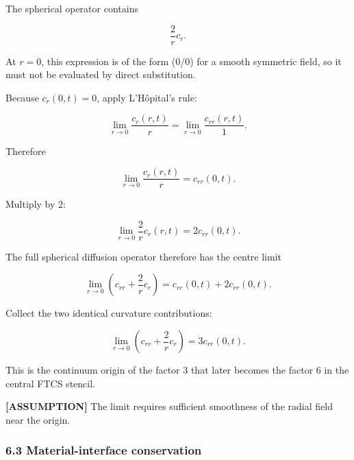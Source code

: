 \documentclass[11pt,a4paper]{article}
\begin{document}
The spherical operator contains

\begin{equation}
\frac{2}{r}c_r.
\tag{TRISO-BC-104}
\label{eq:triso-bc-104}
\end{equation}

At $r=0$, this expression is of the form (0/0) for a smooth symmetric field, so it must not be evaluated by direct substitution.

Because $c_r(0,t)=0$, apply L'Hôpital's rule:

\begin{equation}
\lim_{r\to0}\frac{c_r(r,t)}{r}
=
\lim_{r\to0}\frac{c_{rr}(r,t)}{1}.
\tag{TRISO-BC-105}
\label{eq:triso-bc-105}
\end{equation}

Therefore

\begin{equation}
\lim_{r\to0}\frac{c_r(r,t)}{r}
=
c_{rr}(0,t).
\tag{TRISO-BC-106}
\label{eq:triso-bc-106}
\end{equation}

Multiply by 2:

\begin{equation}
\lim_{r\to0}\frac{2}{r}c_r(r,t)
=
2c_{rr}(0,t).
\tag{TRISO-BC-107}
\label{eq:triso-bc-107}
\end{equation}

The full spherical diffusion operator therefore has the centre limit

\begin{equation}
\lim_{r\to0}
\left(
c_{rr}+\frac2r c_r
\right)
=
c_{rr}(0,t)+2c_{rr}(0,t).
\tag{TRISO-BC-108}
\label{eq:triso-bc-108}
\end{equation}

Collect the two identical curvature contributions:

\begin{equation}
\boxed{
\lim_{r\to0}
\left(
c_{rr}+\frac2r c_r
\right)
=
3c_{rr}(0,t).
}
\tag{TRISO-BC-109}
\label{eq:triso-bc-109}
\end{equation}

This is the continuum origin of the factor 3 that later becomes the factor 6 in the central FTCS stencil.

\textbf{[ASSUMPTION]} The limit requires sufficient smoothness of the radial field near the origin.

\subsubsection*{6.3 Material-interface conservation}
\end{document}
